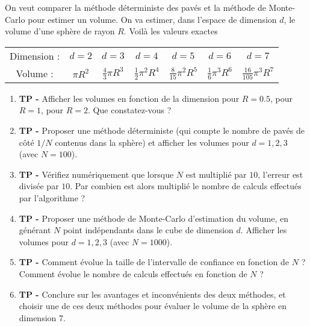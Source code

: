 \documentclass[solutions]{exercices}
\begin{document}
\begin{exercice}
On veut comparer la méthode déterministe des pavés et la méthode de Monte-Carlo pour estimer un volume. On va estimer, dans l'espace de dimension $d$, le volume d'une sphère de rayon $R$. Voilà les valeurs exactes
\begin{center}
\begin{tabular}{ccccccc}
Dimension :&$d=2$&$d=3$&$d=4$&$d=5$&$d=6$&$d=7$\\
Volume :&$\pi R^2$&$\frac{4}{3}\pi R^3$&$\frac{1}{2}\pi^2 R^4 $&$\frac{8}{15}\pi^2 R^5$&$\frac{1}{6}\pi^3 R^6$&$\frac{16}{105}\pi^3 R^7$
\end{tabular}
\end{center}
\begin{enumerate}
\item \textbf{TP -} Afficher les volumes en fonction de la dimension pour $R = 0.5$, pour $R= 1$, pour $R=2$. Que constatez-vous ?
\item \textbf{TP -} Proposer une méthode déterministe (qui compte le nombre de pavés de côté $1/N$ contenus dans la sphère) et afficher les volumes pour $d=1,2,3$ (avec $N=100$).
\item \textbf{TP -} Vérifiez numériquement que lorsque $N$ est multiplié par $10$, l'erreur est divisée par $10$. Par combien est alors multiplié le nombre de calculs effectués par l'algorithme ?
\item \textbf{TP -} Proposer une méthode de Monte-Carlo d'estimation du volume, en générant $N$ point indépendants dans le cube de dimension $d$. Afficher les volumes pour $d=1,2,3$ (avec $N=1000$).
\item \textbf{TP -} Comment évolue la taille de l'intervalle de confiance en fonction de $N$ ? Comment évolue le nombre de calculs effectués en fonction de $N$ ?
\item \textbf{TP -} Conclure sur les avantages et inconvénients des deux méthodes, et choisir une de ces deux méthodes pour évaluer le volume de la sphère en dimension 7.
\end{enumerate}
\end{exercice}
\end{document}
